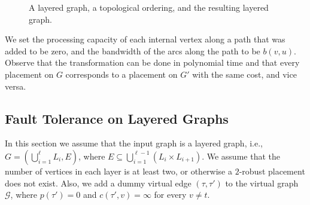 \documentclass[11pt]{article}
\newcommand{\calG}{\mathcal{G}}
\begin{document}
\begin{figure}[t]
\begin{center}

\end{center}
\caption{A layered graph, a topological ordering, and the resulting
  layered graph.}
\label{fig:layer-transform}
\end{figure}

We set the processing capacity of each internal vertex along a path
that was added to be zero, and the bandwidth of the arcs along the
path to be $b(v,u)$.  Observe that the transformation can be done in
polynomial time and that every placement on $G$ corresponds to a
placement on $G'$ with the same cost, and vice versa.


\subsection{Fault Tolerance on Layered Graphs}

In this section we assume that the input graph is a layered graph,
i.e., $G = (\bigcup_{i = 1}^\ell L_i, E)$, where $E \subseteq
\bigcup_{i = 1}^{\ell - 1} (L_i \times L_{i+1})$.  We assume that the
number of vertices in each layer is at least two, or otherwise a
$2$-robust placement does not exist.
%
Also, we add a dummy virtual edge $(\tau,\tau')$ to the virtual graph
$\calG$, where $p(\tau')=0$ and $c(\tau',v) = \infty$ for every $v
\neq t$.
\end{document}
